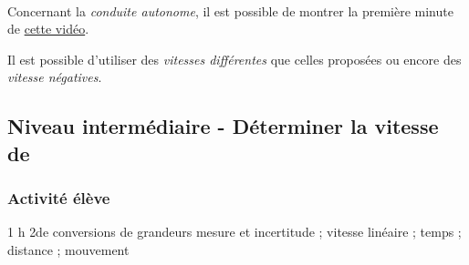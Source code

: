 \begin{minipage}[t]{0.5\linewidth}

    \begin{remarque}~\\
        
        Concernant la \emph{conduite autonome}, il est possible de montrer la première minute de \href{https://www.youtube.com/watch?v=HMhzLhQLoBQ}{cette vidéo}.
        
        
        Il est possible d'utiliser des \emph{vitesses différentes} que celles proposées ou encore des \emph{vitesse négatives}.
        
    \end{remarque}

\end{minipage}

\newpage
\subsection{Niveau intermédiaire - Déterminer la vitesse de \mbot}

\subsubsection{Activité élève}

\cartouche
{1 h}         %
{2de}           %
{conversions de grandeurs}        %
{mesure et incertitude ;  vitesse linéaire ; temps ; distance ; mouvement}     %
{}       %


